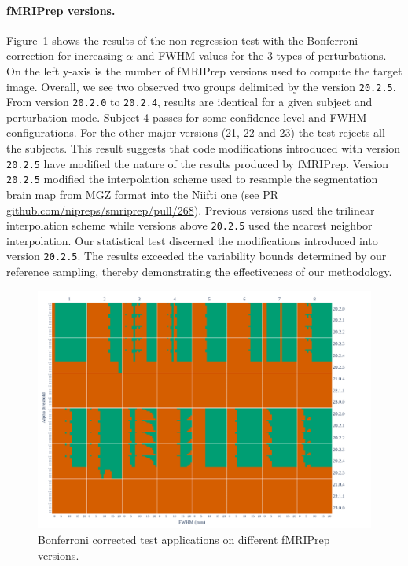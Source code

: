 \documentclass{article}
\newcommand{\fmriprep}{fMRIPrep\xspace}
\begin{document}
\paragraph*{\fmriprep versions.} Figure~\ref{fig:version_bonferroni} shows the results of the non-regression test with the Bonferroni correction for increasing $\alpha$ and FWHM values for the 3 types of perturbations. On the left y-axis is the number of \fmriprep versions used to compute the target image. Overall, we see two observed two groups delimited by the version \texttt{20.2.5}. From version \texttt{20.2.0} to \texttt{20.2.4}, results are identical for a given subject and perturbation mode. Subject 4 passes for some confidence level and FWHM configurations. For the other major versions (21, 22 and 23) the test rejects all the subjects. This result suggests that code modifications introduced with version \texttt{20.2.5} have modified the nature of the results produced by \fmriprep. Version \texttt{20.2.5} modified the interpolation scheme used to resample the segmentation brain map from MGZ format into the Niifti one (see PR \href{https://github.com/nipreps/smriprep/pull/268}{\url{github.com/nipreps/smriprep/pull/268}}). Previous versions used the trilinear interpolation scheme while versions above \texttt{20.2.5} used the nearest neighbor interpolation. Our statistical test discerned the modifications introduced into version \texttt{20.2.5}. The results exceeded the variability bounds determined by our reference sampling, thereby demonstrating the effectiveness of our methodology.


\begin{figure}
    \centering
    \includegraphics[width=\linewidth]{figures/fmriprep-versions/bonferroni.pdf}
    \caption{Bonferroni corrected test applications on different \fmriprep versions.}
    \label{fig:version_bonferroni}
\end{figure}
\end{document}
